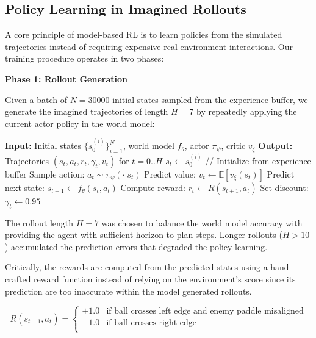 \documentclass[
	english,
	ruledheaders=section,
	class=report,
	thesis={type=master},
	accentcolor=9c,
	custommargins=true,
	marginpar=false,
	parskip=half-,
	fontsize=11pt,
	pdfa=true,
]{tudapub}
\newcommand{\worldmodel}{world model}
\begin{document}
\subsection{Policy Learning in Imagined Rollouts}
\label{subsec:imagined_rollouts}

A core principle of model-based RL is to learn policies from the simulated
trajectories instead of requiring expensive real environment interactions. Our
training procedure operates in two phases:

\textbf{Phase 1: Rollout Generation}

Given a batch of $N=30000$ initial states sampled from the experience buffer,
we generate the imagined trajectories of length $H=7$ by repeatedly applying
the current actor policy in the \worldmodel{}:

\begin{algorithm}
	\caption{Imagined Rollout Generation}
	\begin{algorithmic}[1]
		\STATE \textbf{Input:} Initial states $\{s_0^{(i)}\}_{i=1}^N$, \worldmodel{} $f_\theta$, actor $\pi_\psi$, critic $v_\xi$
		\STATE \textbf{Output:} Trajectories $(s_t, a_t, r_t, \gamma_t, v_t)$ for $t=0..H$
		\STATE $s_t \gets s_0^{(i)}$ \hfill // Initialize from experience buffer
		\STATE Sample action: $a_t \sim \pi_\psi(\cdot | s_t)$
		\STATE Predict value: $v_t \gets \mathbb{E}[v_\xi(s_t)]$
		\STATE Predict next state: $s_{t+1} \gets f_\theta(s_t, a_t)$
		\STATE Compute reward: $r_t \gets R(s_{t+1}, a_t)$
		\STATE Set discount: $\gamma_t \gets 0.95$
		\ENDFOR
		\ENDFOR
	\end{algorithmic}
\end{algorithm}

The rollout length $H=7$ was chosen to balance the \worldmodel{} accuracy with
providing the agent with sufficient horizon to plan steps. Longer rollouts ($H
	> 10$) accumulated the prediction errors that degraded the policy learning.

Critically, the rewards are computed from the predicted states using a
hand-crafted reward function instead of relying on the environment's score
since its prediction are too inaccurate within the model generated rollouts.

\begin{equation}
	R(s_{t+1}, a_t) = \begin{cases}
		+1.0 & \text{if ball crosses left edge and enemy paddle misaligned} \\
		-1.0 & \text{if ball crosses right edge}                            \\
	\end{cases}
\end{equation}
\end{document}
